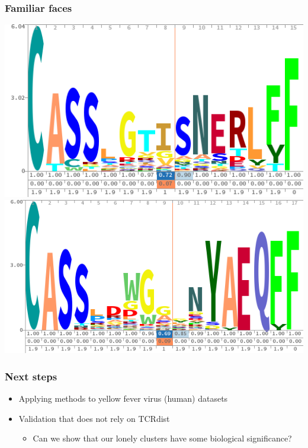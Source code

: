 \documentclass[mathserif,compress,xcolor={dvipsnames}]{beamer}
\renewcommand\;{\,}
\begin{document}
\begin{frame}\frametitle{Familiar faces}
\begin{center}
\includegraphics[width=0.6\linewidth]{Images/revere_logo.png}
\\
\includegraphics[width=0.6\linewidth]{Images/tremont_logo.png}
\end{center}
\end{frame}


\begin{frame}\frametitle{Next steps}
\begin{itemize}
\item
Applying methods to yellow fever virus (human) datasets
\bigskip
\item
Validation that does not rely on TCRdist
\begin{itemize}
\bigskip
\item
Can we show that our lonely clusters have some biological significance?
\end{itemize}
\end{itemize}
\end{frame}
\end{document}
